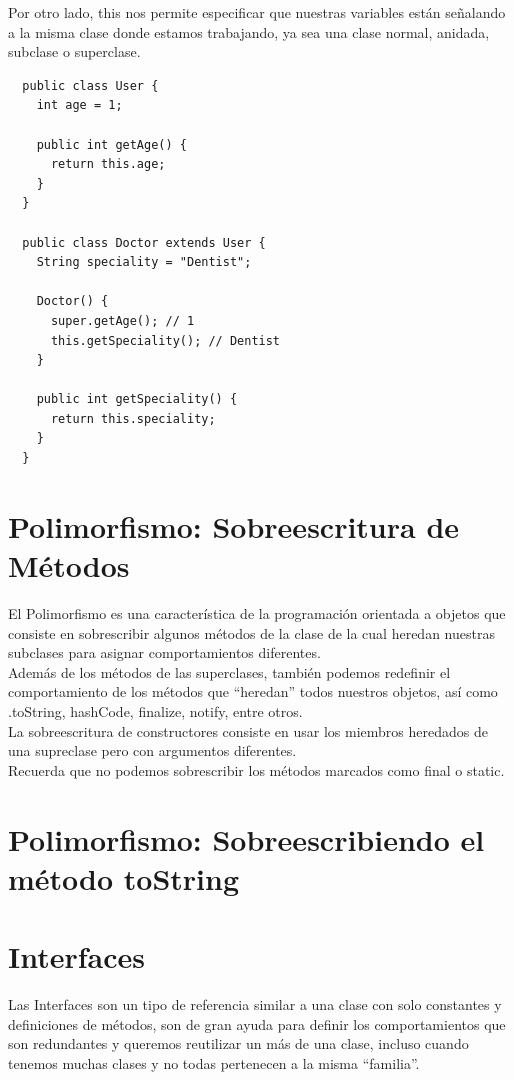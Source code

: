 \documentclass{article}
\begin{document}
Por otro lado, this nos permite especificar que nuestras variables están
señalando a la misma clase donde estamos trabajando, ya sea una clase normal,
anidada, subclase o superclase.\\

\begin{verbatim}
  public class User {
    int age = 1;

    public int getAge() {
      return this.age;
    }
  }

  public class Doctor extends User {
    String speciality = "Dentist";

    Doctor() {
      super.getAge(); // 1
      this.getSpeciality(); // Dentist
    }

    public int getSpeciality() {
      return this.speciality;
    }
  }
\end{verbatim}


\section{Polimorfismo: Sobreescritura de Métodos}%
El Polimorfismo es una característica de la programación orientada a objetos
que consiste en sobrescribir algunos métodos de la clase de la cual heredan
nuestras subclases para asignar comportamientos diferentes.\\

Además de los métodos de las superclases, también podemos redefinir el
comportamiento de los métodos que “heredan” todos nuestros objetos, así como
.toString, hashCode, finalize, notify, entre otros.\\

La sobreescritura de constructores consiste en usar los miembros heredados de
una supreclase pero con argumentos diferentes.\\

Recuerda que no podemos sobrescribir los métodos marcados como final o
static.\\


\section{Polimorfismo: Sobreescribiendo el método toString}%


\section{Interfaces}%
Las Interfaces son un tipo de referencia similar a una clase con solo
constantes y definiciones de métodos, son de gran ayuda para definir los
comportamientos que son redundantes y queremos reutilizar un más de una clase,
incluso cuando tenemos muchas clases y no todas pertenecen a la misma
“familia”.\\
\end{document}
